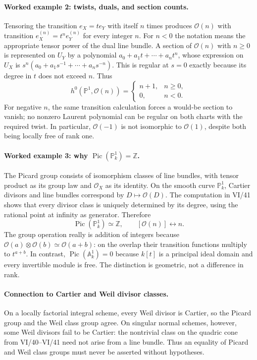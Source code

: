 \paragraph{Worked example 2: twists, duals, and section counts.}
Tensoring the transition $e_X=t e_Y$ with itself $n$ times
produces $\mathcal O(n)$ with transition $e_X^{(n)}=t^n e_Y^{(n)}$
for every integer $n$.  For $n<0$ the notation means the
appropriate tensor power of the dual line bundle.  A section of
$\mathcal O(n)$ with $n\geq0$ is represented on $U_Y$ by a
polynomial $a_0+a_1t+\cdots+a_nt^n$, whose expression on $U_X$
is $s^n(a_0+a_1s^{-1}+\cdots+a_ns^{-n})$.  This is regular
at $s=0$ exactly because its degree in $t$ does not exceed $n$.
Thus
\[
 h^0\!\left(\mathbb P^1,\mathcal O(n)\right)=
 \begin{cases}n+1,&n\geq0,\\0,&n<0.\end{cases}
\]
For negative $n$, the same transition calculation forces a
would-be section to vanish; no nonzero Laurent polynomial can
be regular on both charts with the required twist.
In particular, $\mathcal O(-1)$ is not isomorphic to
$\mathcal O(1)$, despite both being locally free of rank one.

\paragraph{Worked example 3: why $\operatorname{Pic}(\mathbb P^1_k)=\mathbb Z$.}
The Picard group consists of isomorphism classes of line bundles,
with tensor product as its group law and $\mathcal O_X$ as its
identity.  On the smooth curve $\mathbb P^1_k$, Cartier divisors
and line bundles correspond by $D\mapsto\mathcal O(D)$.
The computation in VI/41 shows that every divisor class is
uniquely determined by its degree, using the rational point at
infinity as generator.  Therefore
\[
 \operatorname{Pic}(\mathbb P^1_k)\simeq\mathbb Z,
 \qquad [\mathcal O(n)]\longleftrightarrow n.
\]
The group operation really is addition of integers because
$\mathcal O(a)\otimes\mathcal O(b)\simeq\mathcal O(a+b)$:
on the overlap their transition functions multiply to $t^{a+b}$.
In contrast, $\operatorname{Pic}(\mathbb A^1_k)=0$ because
$k[t]$ is a principal ideal domain and every invertible module
is free.  The distinction is geometric, not a difference in rank.

\paragraph{Connection to Cartier and Weil divisor classes.}
On a locally factorial integral scheme, every Weil divisor is
Cartier, so the Picard group and the Weil class group agree.
On singular normal schemes, however, some Weil divisors fail to
be Cartier: the nontrivial class on the quadric cone from VI/40--VI/41
need not arise from a line bundle.  Thus an equality of Picard
and Weil class groups must never be asserted without hypotheses.
